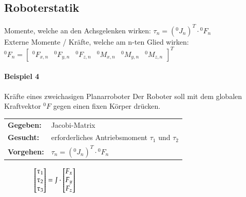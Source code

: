 \subsection{Roboterstatik}
Momente, welche an den Achsgelenken wirken:\newline
$\tau_{n}=({}^0J_n)^T \cdot {}^0F_n$  \\
Externe Momente / Kräfte, welche am n-ten Glied wirken:\newline
${}^0F_n = \begin{bmatrix} {}^0F_{x,n} & {}^0F_{y,n} & {}^0F_{z,n} & {}^0M_{x,n}
& {}^0M_{y,n} & {}^0M_{z,n}
\end{bmatrix}^{T} $ \newline
\paragraph{Beispiel 4} Kräfte eines zweichasigen Planarroboter\newline
Der Roboter soll mit dem globalen Kraftvektor ${}^0F$ gegen einen fixen Körper drücken.\newline
\null\hspace{0.5cm}\begin{tabular}{ll}
    \textbf{Gegeben:}& Jacobi-Matrix\\
    \textbf{Gesucht:}& erforderliches Antriebsmoment $\tau_1$ und $\tau_2$\\
    \textbf{Vorgehen:} & $\tau_{n}=({}^0J_n)^T \cdot {}^0F_n$  \\
\end{tabular}$\null \qquad\qquad
\begin{bmatrix}
\tau_{1} \\ \tau_{2} \\ \tau_{3}
\end{bmatrix}          
=  J \cdot
\begin{bmatrix}
F_{x} \\ F_{y} \\ F_{z}
\end{bmatrix}
$
\clearpage

